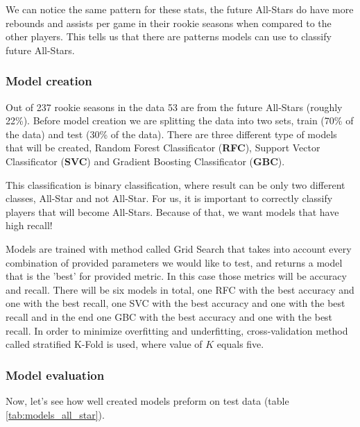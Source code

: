 \documentclass[a4paper]{article}
\begin{document}
We can notice the same pattern for these stats, the future All-Stars do have more rebounds and assists per game in their rookie seasons when compared to the other players. This tells us that there are patterns models can use to classify future All-Stars.

\subsubsection{Model creation}
\label{subsubsec:model_creation_all_star}

Out of 237 rookie seasons in the data 53 are from the future All-Stars (roughly 22\%). Before model creation we are splitting the data into two sets, train (70\% of the data) and test (30\% of the data). There are three different type of models that will be created, Random Forest Classificator (\textbf{RFC}), Support Vector Classificator (\textbf{SVC}) and Gradient Boosting Classificator (\textbf{GBC}).

This classification is binary classification, where result can be only two different classes, All-Star and not All-Star. For us, it is important to correctly classify players that will become All-Stars. Because of that, we want models that have high recall!

Models are trained with method called Grid Search that takes into account every combination of provided parameters we would like to test, and returns a model that is the 'best' for provided metric. In this case those metrics will be accuracy and recall. There will be six models in total, one RFC with the best accuracy and one with the best recall, one SVC with the best accuracy and one with the best recall and in the end one GBC with the best accuracy and one with the best recall. In order to minimize overfitting and underfitting, cross-validation method called stratified K-Fold \cite{crossVal} is used, where value of $K$ equals five.

\subsubsection{Model evaluation}
\label{subsubsec:model_eval_all_star}

Now, let's see how well created models preform on test data (table \ref{tab:models_all_star}).
\end{document}
